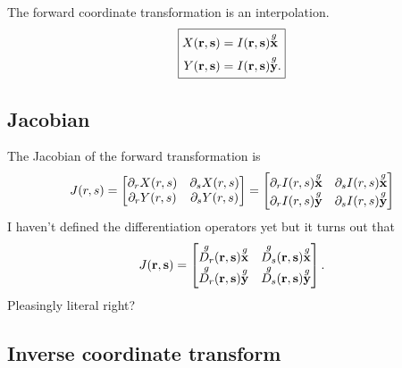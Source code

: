 The forward coordinate transformation is an interpolation.
%
\begin{equation}
\boxed{
\begin{aligned}
X(\ve r, \ve s) &= I(\ve r, \ve s) \g{\ve x} \\
Y(\ve r, \ve s) &= I(\ve r, \ve s) \g{\ve y}.
\end{aligned}
}%
\end{equation}

\subsection{Jacobian}
\label{sec:curvilinear_jacobian}

The Jacobian of the forward transformation is
%
\begin{equation}
J(r, s) =
\begin{bmatrix}
\partial_r X(r, s) & \partial_s X(r, s) \\
\partial_r Y(r, s) & \partial_s Y(r, s)
\end{bmatrix}
=
\begin{bmatrix}
\partial_r I(r, s) \overset{g}{\textbf{x}} & \partial_s I(r, s) \overset{g}{\textbf{x}} \\
\partial_r I(r, s) \overset{g}{\textbf{y}} & \partial_s I(r, s) \overset{g}{\textbf{y}}
\end{bmatrix}
\end{equation}
%
I haven't defined the differentiation operators yet but it turns out that
%
\begin{equation}
J(\textbf{r}, \textbf{s}) =
\begin{bmatrix}
\overset{g}{D_r}(\textbf{r}, \textbf{s}) \overset{g}{\textbf{x}} & \overset{g}{D_s}(\textbf{r}, \textbf{s}) \overset{g}{\textbf{x}} \\
\overset{g}{D_r}(\textbf{r}, \textbf{s}) \overset{g}{\textbf{y}} & \overset{g}{D_s}(\textbf{r}, \textbf{s}) \overset{g}{\textbf{y}}
\end{bmatrix}.
\end{equation}
%
Pleasingly literal right?

\subsection{Inverse coordinate transform}

